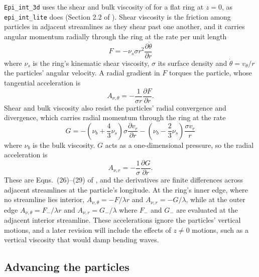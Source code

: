 \documentclass[twocolumn]{aastex702}
\newcommand{\code}[1]{\texttt{#1}}   %
\begin{document}
\code{Epi\_int\_3d} uses the shear and bulk viscosity of \cite{HS13} for a flat ring at $z=0$, as
\code{epi\_int\_lite} does (Section 2.2 of \citealt{H25}). Shear viscosity is the friction among
particles in adjacent streamlines as they shear past one another, and it carries angular momentum
radially through the ring at the rate per unit length
\begin{equation}
    \label{eqn:visc_F}
    F = -\nu_s\sigma r^2\frac{\partial\dot{\theta}}{\partial r}
\end{equation}
where $\nu_s$ is the ring's kinematic shear viscosity, $\sigma$ its surface density and $\dot{\theta} = v_\theta/r$
the particles' angular velocity. A radial gradient in $F$ torques the particle, whose tangential acceleration is
\begin{equation}
    \label{eqn:visc_At}
    A_{\nu,\theta} = -\frac{1}{\sigma r}\frac{\partial F}{\partial r}.
\end{equation}
Shear and bulk viscosity also resist the particles' radial convergence and divergence, which carries
radial momentum through the ring at the rate
\begin{equation}
    \label{eqn:visc_G}
    G = -\left(\nu_b + \frac{4}{3}\nu_s\right)\sigma\frac{\partial v_r}{\partial r}
        - \left(\nu_b - \frac{2}{3}\nu_s\right)\frac{\sigma v_r}{r}
\end{equation}
where $\nu_b$ is the bulk viscosity. $G$ acts as a one-dimensional pressure, so the radial acceleration is
\begin{equation}
    \label{eqn:visc_Ar}
    A_{\nu,r} = -\frac{1}{\sigma}\frac{\partial G}{\partial r}.
\end{equation}
These are Eqns.\ (26)--(29) of \cite{HS13}, and the derivatives are finite differences across adjacent streamlines
at the particle's longitude. At the ring's inner edge, where no streamline lies interior, $A_{\nu,\theta} = -F/\lambda r$ and
$A_{\nu,r} = -G/\lambda$, while at the outer edge $A_{\nu,\theta} = F_-/\lambda r$ and $A_{\nu,r} = G_-/\lambda$ where
$F_-$ and $G_-$ are evaluated at the adjacent interior streamline. These accelerations ignore the particles' vertical motions, and a later revision will
include the effects of $z\ne0$ motions, such as a vertical viscosity that would damp bending waves.

\subsection{Advancing the particles}
\label{sec:integrator}
\end{document}
